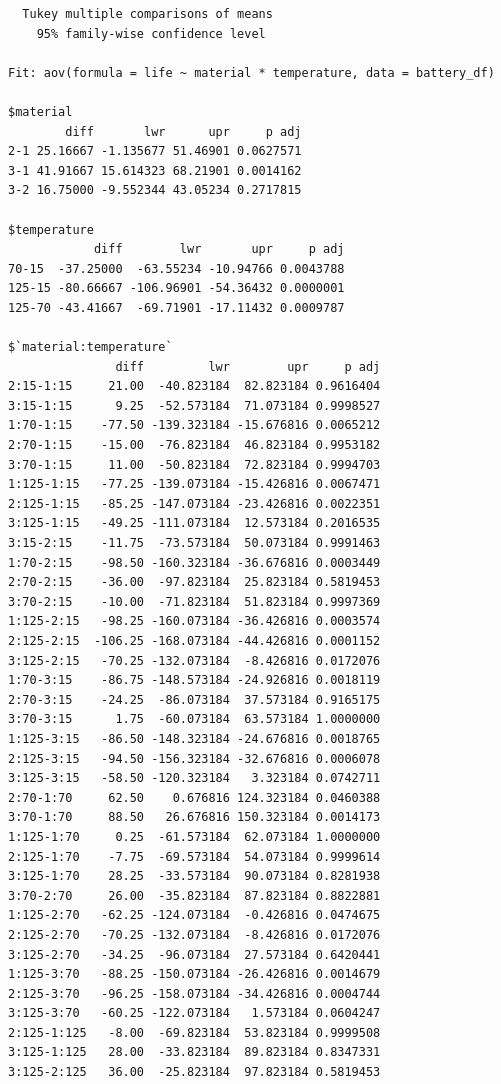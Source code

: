 \documentclass[
  letterpaper,
]{scrbook}
\begin{document}
\begin{verbatim}
  Tukey multiple comparisons of means
    95% family-wise confidence level

Fit: aov(formula = life ~ material * temperature, data = battery_df)

$material
        diff       lwr      upr     p adj
2-1 25.16667 -1.135677 51.46901 0.0627571
3-1 41.91667 15.614323 68.21901 0.0014162
3-2 16.75000 -9.552344 43.05234 0.2717815

$temperature
            diff        lwr       upr     p adj
70-15  -37.25000  -63.55234 -10.94766 0.0043788
125-15 -80.66667 -106.96901 -54.36432 0.0000001
125-70 -43.41667  -69.71901 -17.11432 0.0009787

$`material:temperature`
               diff         lwr        upr     p adj
2:15-1:15     21.00  -40.823184  82.823184 0.9616404
3:15-1:15      9.25  -52.573184  71.073184 0.9998527
1:70-1:15    -77.50 -139.323184 -15.676816 0.0065212
2:70-1:15    -15.00  -76.823184  46.823184 0.9953182
3:70-1:15     11.00  -50.823184  72.823184 0.9994703
1:125-1:15   -77.25 -139.073184 -15.426816 0.0067471
2:125-1:15   -85.25 -147.073184 -23.426816 0.0022351
3:125-1:15   -49.25 -111.073184  12.573184 0.2016535
3:15-2:15    -11.75  -73.573184  50.073184 0.9991463
1:70-2:15    -98.50 -160.323184 -36.676816 0.0003449
2:70-2:15    -36.00  -97.823184  25.823184 0.5819453
3:70-2:15    -10.00  -71.823184  51.823184 0.9997369
1:125-2:15   -98.25 -160.073184 -36.426816 0.0003574
2:125-2:15  -106.25 -168.073184 -44.426816 0.0001152
3:125-2:15   -70.25 -132.073184  -8.426816 0.0172076
1:70-3:15    -86.75 -148.573184 -24.926816 0.0018119
2:70-3:15    -24.25  -86.073184  37.573184 0.9165175
3:70-3:15      1.75  -60.073184  63.573184 1.0000000
1:125-3:15   -86.50 -148.323184 -24.676816 0.0018765
2:125-3:15   -94.50 -156.323184 -32.676816 0.0006078
3:125-3:15   -58.50 -120.323184   3.323184 0.0742711
2:70-1:70     62.50    0.676816 124.323184 0.0460388
3:70-1:70     88.50   26.676816 150.323184 0.0014173
1:125-1:70     0.25  -61.573184  62.073184 1.0000000
2:125-1:70    -7.75  -69.573184  54.073184 0.9999614
3:125-1:70    28.25  -33.573184  90.073184 0.8281938
3:70-2:70     26.00  -35.823184  87.823184 0.8822881
1:125-2:70   -62.25 -124.073184  -0.426816 0.0474675
2:125-2:70   -70.25 -132.073184  -8.426816 0.0172076
3:125-2:70   -34.25  -96.073184  27.573184 0.6420441
1:125-3:70   -88.25 -150.073184 -26.426816 0.0014679
2:125-3:70   -96.25 -158.073184 -34.426816 0.0004744
3:125-3:70   -60.25 -122.073184   1.573184 0.0604247
2:125-1:125   -8.00  -69.823184  53.823184 0.9999508
3:125-1:125   28.00  -33.823184  89.823184 0.8347331
3:125-2:125   36.00  -25.823184  97.823184 0.5819453
\end{verbatim}
\end{document}
